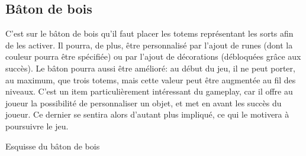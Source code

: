 \newpage
\subsection{Bâton de bois}

C'est sur le bâton de bois qu'il faut placer les totems représentant les sorts afin de les activer. Il pourra, de plus, être personnalisé par l'ajout de runes (dont la couleur pourra être spécifiée) ou par l'ajout de décorations (débloquées grâce aux succès). Le bâton pourra aussi être amélioré: au début du jeu, il ne peut porter, au maximum, que trois totems, mais cette valeur peut être augmentée au fil des niveaux. C'est un item particulièrement intéressant du gameplay, car il offre au joueur la possibilité de personnaliser un objet, et met en avant les succès du joueur. Ce dernier se sentira alors d'autant plus impliqué, ce qui le motivera à poursuivre le jeu.

\begin{figureWithNotes}[ht!]
	\center
	\hspace*{.04\linewidth}
	
	\caption{Esquisse du bâton de bois {\cite{Baguettemagique_}}\label{fig:batonBois}}
\end{figureWithNotes}

